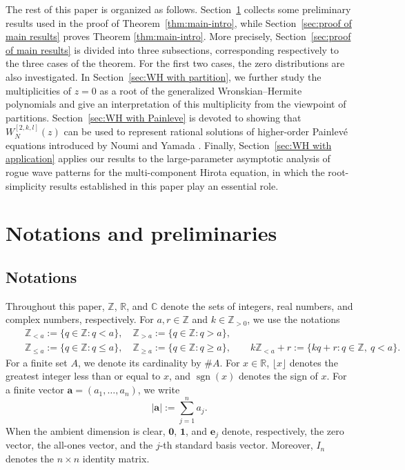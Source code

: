 \documentclass[preprint,3p,10pt]{elsarticle}
\theoremstyle{definition}
\begin{document}
 


The rest of this paper is organized as follows.
Section~\ref{sec:preliminary} collects some preliminary results used in the
proof of Theorem~\ref{thm:main-intro}, while Section~\ref{sec:proof of main results} proves Theorem \ref{thm:main-intro}.
More precisely, Section~\ref{sec:proof of main results} is divided into three
subsections, corresponding respectively to the three cases of the theorem. For the first two cases, the zero distributions are also
investigated. In Section~\ref{sec:WH with partition}, we further study the
multiplicities of $z=0$ as a root of the generalized Wronskian--Hermite polynomials and
give an interpretation of this multiplicity from the viewpoint of partitions.
Section~\ref{sec:WH with Painleve} is devoted to showing that \(W_N^{[2,k,l]}(z)\) can be used to represent rational solutions of higher-order Painlev\'e equations introduced by Noumi and Yamada \cite{noumi1998affine,noumi1999symmetries}. Finally, Section~\ref{sec:WH with application} applies our results to the large-parameter asymptotic analysis of rogue wave patterns for the
multi-component Hirota equation, in which the root-simplicity results established in this paper play an essential role. 



 

 


\section{Notations and preliminaries} \label{sec:preliminary}
\subsection{Notations}
Throughout this paper, \(\mathbb Z\), \(\mathbb R\), and
\(\mathbb C\) denote the sets of integers, real numbers, and complex
 numbers, respectively. 
For \(a,r\in\mathbb Z\) and \(k\in\mathbb Z_{>0}\), we use the notations
\begin{eqnarray*}
&&    \mathbb Z_{<a}
    :=
    \{q\in\mathbb Z:q<a\}, \quad \mathbb Z_{>a}
    :=
    \{q\in\mathbb Z:q>a\},
\\
&&
\mathbb Z_{\leq a}
    :=
    \{q\in\mathbb Z:q\leq a\}, \quad \mathbb Z_{\geq a}
    :=
    \{q\in\mathbb Z:q \geq a\},
    \qquad
    k\mathbb Z_{<a}+r
    :=
    \{kq+r:q\in\mathbb Z,\ q<a\}.
\end{eqnarray*}
For a finite set \(A\), we denote its cardinality by \(\#A\).
For \(x\in\mathbb R\), \(\lfloor x\rfloor\) denotes the greatest
integer less than or equal to \(x\), and
\(\operatorname{sgn}(x)\) denotes the sign of \(x\).
For a finite vector
\(\mathbf a=(a_1,\ldots,a_n)\), we write
\begin{equation}
    |\mathbf a|
    :=
    \sum_{j=1}^{n}a_j.
\end{equation}
When the ambient dimension is clear, \(\mathbf 0\), \(\mathbf 1\),
and \(\mathbf e_j\) denote, respectively, the zero vector, the
all-ones vector, and the \(j\)-th standard basis vector. Moreover,
\(I_n\) denotes the \(n\times n\) identity matrix.
\end{document}
